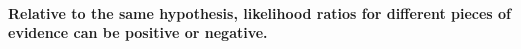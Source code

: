 \documentclass[10pt]{article}
\begin{document}
\begin{comment}
As discussed earlier, a piece of evidence favors a hypothesis whenever 
it raises its probability or whenever the likelihood ratio is greater than one. 
If, on the other hand, the probability of the hypothesis shifts downwards as 
we take into account the evidence or the likelihood ratio is less than one, 
the evidence disfavors the hypothesis. 
In short:
%
\[\textit{\text{$E$ disfavors $H$} iff }   P(H|E)< P(H) \textit{ iff } \frac{P(E|H)}{P(E|\neg H)}<1.\]
%
Consider now the hypothesis $CV$ that Adam had contact with the victim (as the crime occurred). 
The probability of $CV$ raises as we take into account the DNA evidence match $M$, but the probability of $CV$ decreases as we take 
into account  Adam's alibi $A$. This, at least, is a plausible stipulation. It is less likely that Adam had 
contact with the victim during the crime, given he has an alibi, than if it did not have an alibi. 
So, we can also say the two pieces of evidence $M$ and $A$ conflict with one another because one 
favors and the other disfavors the same hypothesis $CV$.
%
%
More generally, two pieces of evidence $E1$ and $E2$ conflict 
with one another whenever 
%
\[P(H| E1)>P(H) \text{ and } P(H|E2)<P(H),\]
%
or in terms of likelihood ratios,
%
\[LR1=\frac{P(E1| H)}{P(E1|\neg H)}>1 \text{ and } LR2=\frac{P(E2|H)}{P(E2|\neg H)}<1.\]
%
To recapitulate, we have seen two ways in which the probabilistic framework can represent evidential conflicts.
First, two pieces of evidence conflict with one another whenever they favor incompatible hypotheses; second, they conflict whenever 
one favors and the other disfavors the same hypothesis. It is easy to see that the latter form entails the former, because 
if $P(H|E1)>P(H)$ and $P(H|E2)<P(H)$, then $P(H|E1)>P(H)$ and $P(\neg H|E2)>P(\neg H)$, 
where $H$ and $\neg H$ are clearly compatible hypothesis. 
 WHAT ABOUT THE OTHER DIRECTION?
 
 \end{comment}
 
 
\paragraph{Relative to the same hypothesis, likelihood ratios for different pieces of evidence can be positive or negative.}
\end{document}
